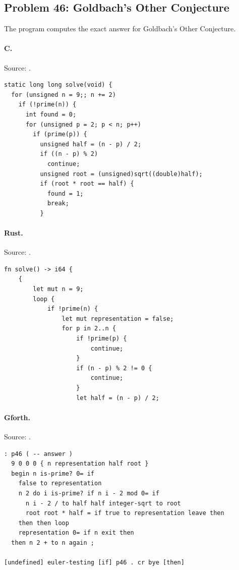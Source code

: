 \subsection{Problem 46: Goldbach's Other Conjecture}
\label{walkthrough:p46}
The program computes the exact answer for Goldbach's Other Conjecture.

\paragraph{C.} Source: .
\begin{lstlisting}
static long long solve(void) {
  for (unsigned n = 9;; n += 2)
    if (!prime(n)) {
      int found = 0;
      for (unsigned p = 2; p < n; p++)
        if (prime(p)) {
          unsigned half = (n - p) / 2;
          if ((n - p) % 2)
            continue;
          unsigned root = (unsigned)sqrt((double)half);
          if (root * root == half) {
            found = 1;
            break;
          }
\end{lstlisting}

\paragraph{Rust.} Source: .
\begin{lstlisting}
fn solve() -> i64 {
    {
        let mut n = 9;
        loop {
            if !prime(n) {
                let mut representation = false;
                for p in 2..n {
                    if !prime(p) {
                        continue;
                    }
                    if (n - p) % 2 != 0 {
                        continue;
                    }
                    let half = (n - p) / 2;
\end{lstlisting}

\paragraph{Gforth.} Source: .
\begin{lstlisting}
: p46 ( -- answer )
  9 0 0 0 { n representation half root }
  begin n is-prime? 0= if
    false to representation
    n 2 do i is-prime? if n i - 2 mod 0= if
      n i - 2 / to half half integer-sqrt to root
      root root * half = if true to representation leave then
    then then loop
    representation 0= if n exit then
  then n 2 + to n again ;

[undefined] euler-testing [if] p46 . cr bye [then]
\end{lstlisting}

